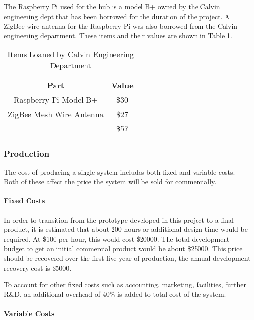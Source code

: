 \documentclass[PPFS.tex]{template/subfiles}
\begin{document}
        The Raspberry Pi used for the hub is a model B+ owned by the Calvin engineering dept that has been borrowed for the duration of the project. A ZigBee wire antenna for the Raspberry Pi was also borrowed from the Calvin engineering department. These items and their values are shown in Table \ref{tab:devLoanedItems}.
        
        \begin{table}[H]
        	\begin{center}
        		\caption{Items Loaned by Calvin Engineering Department}
        		\label{tab:devLoanedItems}
        		\begin{tabular}{|c|c|}
        			\hline
        			Part & Value\\
        			\hline
        			Raspberry Pi Model B+ & \$30 \\
        			\hline
        			ZigBee Mesh Wire Antenna & \$27 \\
        			\hline
        			& \$57\\
        			\hline
        		\end{tabular}
        	\end{center}
        \end{table}
        \subsubsection{Production}
        The cost of producing a single system includes both fixed and variable costs. Both of these affect the price the system will be sold for commercially.
        
        \paragraph{Fixed Costs}	
        In order to transition from the prototype developed in this project to a final product, it is estimated that about 200 hours or additional design time would be required. At \$100 per hour, this would cost \$20000. The total development budget to get an initial commercial product would be about \$25000. This price should be recovered over the first five year of production, the annual development recovery cost is \$5000.
        
        To account for other fixed costs such as accounting, marketing, facilities, further R\&D, an additional overhead of 40\% is added to total cost of the system.
        
        \paragraph{Variable Costs}
        
\end{document}
